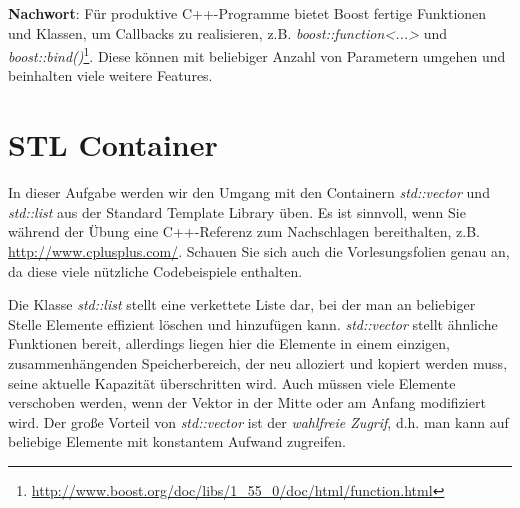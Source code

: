 \documentclass[
  accentcolor=tud1c,	%
  colorbacktitle,		%
  inverttitle,			%
  german,				%
  twoside
]{tudexercise}
\begin{document}
\textbf{Nachwort}:
Für produktive C++-Programme bietet Boost fertige Funktionen und Klassen, um Callbacks zu realisieren, z.B. \emph{boost::function<...>} und \emph{boost::bind()}\footnote{\url{http://www.boost.org/doc/libs/1_55_0/doc/html/function.html}}. Diese können mit beliebiger Anzahl von Parametern umgehen und beinhalten viele weitere Features.

\section{STL Container} 
In dieser Aufgabe werden wir den Umgang mit den Containern \emph{std::vector} und \emph{std::list} aus der Standard Template Library üben.
Es ist sinnvoll, wenn Sie während der Übung eine C++-Referenz zum Nachschlagen bereithalten, z.B. \url{http://www.cplusplus.com/}.
Schauen Sie sich auch die Vorlesungsfolien genau an, da diese viele nützliche Codebeispiele enthalten.
\vspace{1ex}

Die Klasse \emph{std::list} stellt eine verkettete Liste dar, bei der man an beliebiger Stelle Elemente effizient löschen und hinzufügen kann. \emph{std::vector} stellt ähnliche Funktionen bereit, allerdings liegen hier die Elemente in einem einzigen, zusammenhängenden Speicherbereich, der neu alloziert und kopiert werden muss, seine aktuelle Kapazität überschritten wird.
Auch müssen viele Elemente verschoben werden, wenn der Vektor in der Mitte oder am Anfang modifiziert wird.
Der große Vorteil von \emph{std::vector} ist der \emph{wahlfreie Zugrif}, d.h. man kann auf beliebige Elemente mit konstantem Aufwand zugreifen.
\end{document}
